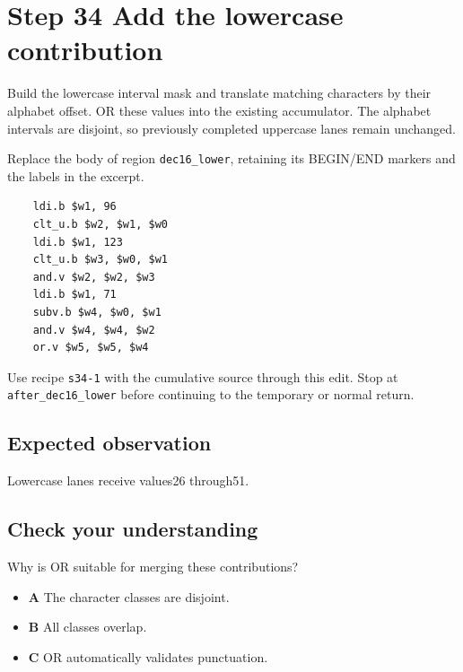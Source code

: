 \section{Step 34 Add the lowercase contribution}\label{base64-s34}

Build the lowercase interval mask and translate matching characters by their alphabet offset. OR these values into the existing accumulator. The alphabet intervals are disjoint, so previously completed uppercase lanes remain unchanged.

Replace the body of region \texttt{dec16\_lower}, retaining its BEGIN/END markers and the labels in the excerpt.

\begin{verbatim}
    ldi.b $w1, 96
    clt_u.b $w2, $w1, $w0
    ldi.b $w1, 123
    clt_u.b $w3, $w0, $w1
    and.v $w2, $w2, $w3
    ldi.b $w1, 71
    subv.b $w4, $w0, $w1
    and.v $w4, $w4, $w2
    or.v $w5, $w5, $w4
\end{verbatim}

Use recipe \texttt{s34-1} with the cumulative source through this edit. Stop at \texttt{after\_dec16\_lower} before continuing to the temporary or normal return.

\subsection{Expected observation}
Lowercase lanes receive values26 through51.

\subsection{Check your understanding}
Why is OR suitable for merging these contributions?

\begin{itemize}
  \item \textbf{A} The character classes are disjoint.
  \item \textbf{B} All classes overlap.
  \item \textbf{C} OR automatically validates punctuation.
\end{itemize}
